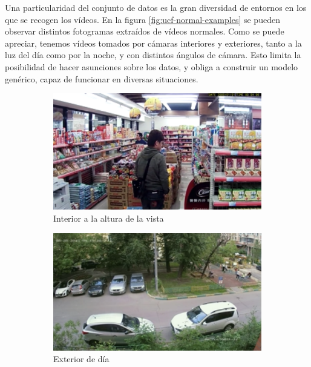 \documentclass[../main.tex]{memoir}
\begin{document}
Una particularidad del conjunto de datos es la gran diversidad de
entornos en los que se recogen los vídeos. En la figura
\ref{fig:ucf-normal-examples} se pueden observar distintos fotogramas
extraídos de vídeos normales. Como se puede apreciar, tenemos vídeos
tomados por cámaras interiores y exteriores, tanto a la luz del día
como por la noche, y con distintos ángulos de cámara. Esto limita la
posibilidad de hacer asunciones sobre los datos, y obliga a construir
un modelo genérico, capaz de funcionar en diversas situaciones.

\begin{figure}[hbtp]
  \centering
  \begin{subfigure}{0.48\textwidth}
    \centering
    \includegraphics[width=\linewidth]{images/ucf-examples/normal-1}
    \caption{Interior a la altura de la vista}
  \end{subfigure}
  \begin{subfigure}{0.48\textwidth}
    \centering
    \includegraphics[width=\linewidth]{images/ucf-examples/normal-2}
    \caption{Exterior de día}
  \end{subfigure}
  \begin{subfigure}{0.48\textwidth}

\end{subfigure}
\end{figure}
\end{document}
